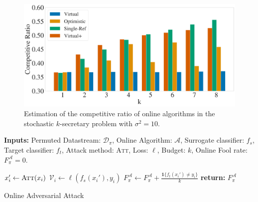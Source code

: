 \begin{minipage}[t]{.48\textwidth}
\begin{figure}[H]
    \includegraphics[width=1.01\linewidth]{Figures/Competitive_Ratio3Bar8-Var-10.pdf}
    \caption{Estimation of the competitive ratio of online algorithms in the stochastic $k$-secretary problem with $\sigma^2=10$.}
    \label{fig:synthetic_data}
\end{figure}
\end{minipage}
\hfill
\begin{minipage}[t]{.48\textwidth}
\vspace{0pt}  
    \begin{algorithm}[H]
    \small
    \textbf{Inputs:} Permuted Datastream: $\mathcal{D}_\pi$, Online Algorithm: $\mathcal{A}$,  Surrogate classifier: $f_s$, Target classifier: $f_t$,  Attack method: \textsc{Att}, Loss: $\ell$,  Budget: $k$,  
    Online Fool rate: $F^{\mathcal{A}}_\pi=0$.
    \begin{algorithmic}[1]
    \STATE $x_i' \leftarrow  \textsc{Att}(x_i)$ \hfill {}
    \STATE $\mathcal{V}_i \leftarrow \ell(f_s(x_i'),y_i)$  \hfill {}
    \STATE  $F^{\mathcal{A}}_\pi \leftarrow F^{\mathcal{A}}_\pi+\tfrac{\mathbf{1}\{f_t(x_i')\neq y_i\}}{k}$  \hfill{} 
    \ENDIF
    \ENDFOR
    \STATE \textbf{return:} $F^{\mathcal{A}}_\pi$ \hfill{} 
    \end{algorithmic}
     \caption{\small Online Adversarial Attack}
     \label{alg:online_adv_attack}
    \end{algorithm}
\end{minipage}

